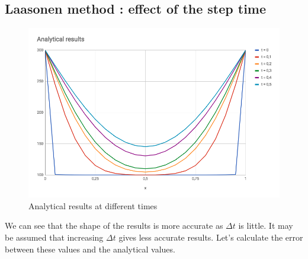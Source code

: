 \documentclass{article}
\begin{document}
        \subsection{Laasonen method : effect of the step time}
        \begin{figure}[H]
            \includegraphics[width=\textwidth]{analytical.png}
            \caption{Analytical results at different times}
        \end{figure}
        We can see that the shape of the results is more accurate as $\Delta t$ is little.
        It may be assumed that increasing $\Delta t$ gives less accurate results.
        Let's calculate the error between these values and the analytical values.
\end{document}
